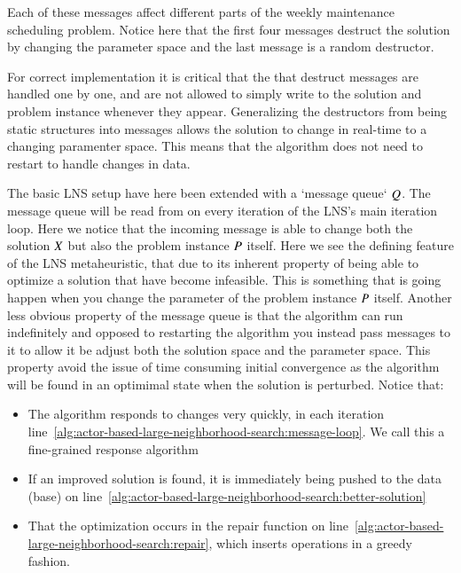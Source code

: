 Each of these messages affect different parts of the weekly maintenance scheduling 
problem. Notice here that the first four messages destruct the solution by
changing the parameter space and the last message is a random destructor.

For correct implementation it is critical that the that destruct messages are 
handled one by one, and are not allowed to simply write to the solution and
problem instance whenever they appear.
Generalizing the destructors from being static structures into messages allows
the solution to change in real-time to a changing paramenter space. This means
that the algorithm does not need to restart to handle changes in data.



The basic LNS setup have here been extended with a `message queue` $Q$. The message
queue will be read from on every iteration of the LNS's main iteration loop.
Here we notice that the incoming message is able to change both the solution $X$
but also the problem instance $P$ itself. Here we see the defining feature
of the LNS metaheuristic, that due to its inherent property of being
able to optimize a solution that have become infeasible. This is something
that is going happen when you change the parameter of the problem
instance $P$ itself. Another less obvious property of the message queue is 
that the algorithm can run indefinitely and opposed to restarting the algorithm you
instead pass messages to it to allow it be adjust both the solution space and
the parameter space. This property avoid the issue of time consuming initial
convergence as the algorithm will be found in an optimimal state when the
solution is perturbed. Notice that:

\begin{itemize}
    \item The algorithm responds to changes very quickly, in each iteration line~\ref{alg:actor-based-large-neighborhood-search:message-loop}. We call this a fine-grained response algorithm
    \item If an improved solution is found, it is immediately being pushed to the data (base) on line~\ref{alg:actor-based-large-neighborhood-search:better-solution}
    \item That the optimization occurs in the repair function on line~\ref{alg:actor-based-large-neighborhood-search:repair}, which inserts operations in a greedy fashion. 
\end{itemize}


